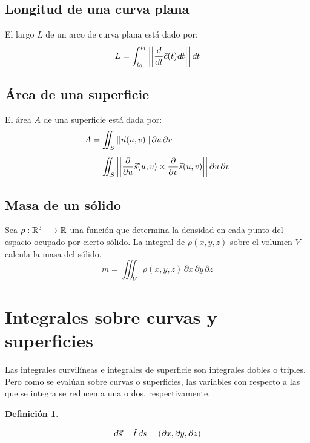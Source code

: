 \documentclass[a5paper,12pt,twoside]{book}
\newtheorem{defn}{{Definición}}[chapter]
\begin{document}
\subsection{Longitud de una curva plana}

El largo $L$ de un arco de curva plana está dado por:
\begin{equation*}
    L = \int_{t_0}^{t_1} {\left|\left| { \dfrac{\textsl{d}}{\textsl{d} t} \Vec{c}(t) \textsl{d} t } \right|\right|} \, \textsl{d} t
\end{equation*}


\subsection{Área de una superficie}

El área $A$ de una superficie está dada por:
\begin{align*}
    A &= \iint_S {\left|\left| {\Vec{n}(u,v)} \right|\right|} \, \partial u \, \partial v
    \\[1ex]
    &= \iint_S {\left|\left| { \dfrac{\partial}{\partial u} \Vec{s}(u,v) \times \dfrac{\partial}{\partial v} \Vec{s}(u,v) } \right|\right|} \, \partial u \, \partial v
\end{align*}


\subsection{Masa de un sólido}

Sea $\rho:\mathbb{R}^3 \longrightarrow \mathbb{R}$ una función que determina la densidad en cada punto del espacio ocupado por cierto sólido. La integral de $\rho (x,y,z)$ sobre el volumen $V$ calcula la masa del sólido.
\begin{equation*}
    m = \iiint_V \rho (x,y,z) \, \partial x \, \partial y \, \partial z
\end{equation*}


\section{Integrales sobre curvas y superficies}

Las integrales curvilíneas e integrales de superficie son integrales dobles o triples. Pero como se evalúan sobre curvas o superficies, las variables con respecto a las que se integra se reducen a una o dos, respectivamente.

\begin{mdframed}[style=MyFrame1]
    \begin{defn}
    \end{defn}
    \begin{equation*}
        \textsl{d} \Vec{s} = \hat{t} \, \textsl{d} s = \left( \partial x, \partial y, \partial z \right)
    \end{equation*}
\end{mdframed}
\end{document}
